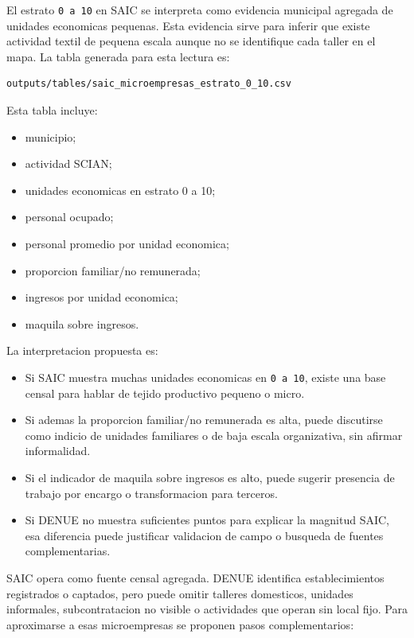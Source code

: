 \documentclass[11pt,letterpaper]{article}
\begin{document}
El estrato \texttt{0 a 10} en SAIC se interpreta como evidencia municipal agregada de unidades economicas pequenas. Esta evidencia sirve para inferir que existe actividad textil de pequena escala aunque no se identifique cada taller en el mapa. La tabla generada para esta lectura es:

\begin{verbatim}
outputs/tables/saic_microempresas_estrato_0_10.csv
\end{verbatim}

Esta tabla incluye:

\begin{itemize}
  \item municipio;
  \item actividad SCIAN;
  \item unidades economicas en estrato 0 a 10;
  \item personal ocupado;
  \item personal promedio por unidad economica;
  \item proporcion familiar/no remunerada;
  \item ingresos por unidad economica;
  \item maquila sobre ingresos.
\end{itemize}

La interpretacion propuesta es:

\begin{itemize}
  \item Si SAIC muestra muchas unidades economicas en \texttt{0 a 10}, existe una base censal para hablar de tejido productivo pequeno o micro.
  \item Si ademas la proporcion familiar/no remunerada es alta, puede discutirse como indicio de unidades familiares o de baja escala organizativa, sin afirmar informalidad.
  \item Si el indicador de maquila sobre ingresos es alto, puede sugerir presencia de trabajo por encargo o transformacion para terceros.
  \item Si DENUE no muestra suficientes puntos para explicar la magnitud SAIC, esa diferencia puede justificar validacion de campo o busqueda de fuentes complementarias.
\end{itemize}

SAIC opera como fuente censal agregada. DENUE identifica establecimientos registrados o captados, pero puede omitir talleres domesticos, unidades informales, subcontratacion no visible o actividades que operan sin local fijo. Para aproximarse a esas microempresas se proponen pasos complementarios:
\end{document}
